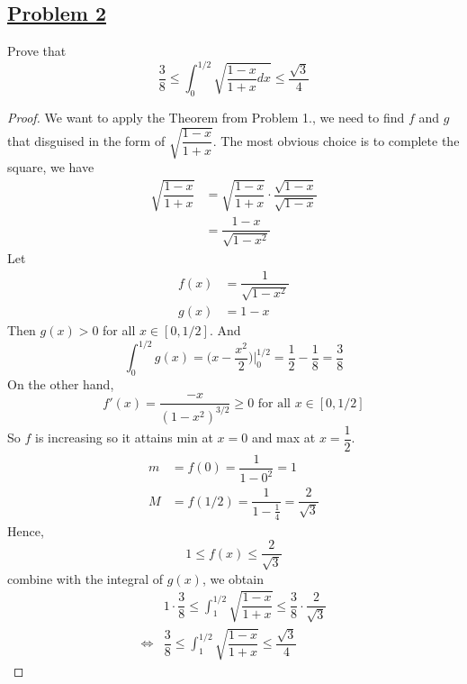 \documentclass[10pt,letterpaper]{article}
\begin{document}
	\subsection*{{\color{purple}\underline{Problem 2}}}
	Prove that 
	$$\dfrac{3}{8} \leq \displaystyle\int_0^{1/2} \sqrt{\dfrac{1-x}{1+x}dx} \leq \dfrac{\sqrt{3}}{4}$$
	\begin{proof}
	We want to apply the Theorem from Problem 1., we need to find $f$ and $g$ that disguised in the form
	of $\sqrt{\dfrac{1-x}{1+x}}$. The most obvious choice is to complete the square, we have
	\begin{align*}
	\sqrt{\dfrac{1-x}{1+x}} &= \sqrt{\dfrac{1-x}{1+x}} \cdot \dfrac{\sqrt{1-x}}{\sqrt{1-x}} \\
	&= \dfrac{1-x}{\sqrt{1 - x^2}} 
	\end{align*}
	Let
	\begin{align*}
	f(x) &= \dfrac{1}{\sqrt{1 - x^2}} \\
	g(x) &= 1 - x 
	\end{align*}	 
	Then $g(x) > 0$ for all $x \in [0, 1/2]$. And
	$$\displaystyle\int_{0}^{1/2} g(x) 
	= \bigg(x - \dfrac{x^2}{2}\bigg)\bigg|_0^{1/2} = \dfrac{1}{2} - \dfrac{1}{8} = \dfrac{3}{8}$$		
	On the other hand, 
	$$f'(x) = \dfrac{-x}{(1 - x^2)^{3/2}} \geq 0 \text{ for all } x \in [0, 1/2]$$
	So $f$ is increasing so it attains min at $x = 0$ and max at $x = \dfrac{1}{2}$.
	\begin{align*}
	m &= f(0) = \dfrac{1}{1 - 0^2} = 1 \\
	M &= f(1/2) = \dfrac{1}{1 - \frac{1}{4}} = \dfrac{2}{\sqrt{3}} 
	\end{align*}
	Hence,
	$$1 \leq f(x) \leq \dfrac{2}{\sqrt{3}}$$
	combine with the integral of $g(x)$, we obtain
	\begin{align*}
	& 1  \cdot \dfrac{3}{8} \leq \displaystyle\int_{1}^{1/2} 
	 \sqrt{\dfrac{1-x}{1+x}} \leq \dfrac{3}{8} \cdot \dfrac{2}{\sqrt{3}} \\
	\Leftrightarrow &
	 \dfrac{3}{8} \leq \displaystyle\int_{1}^{1/2} 
	 \sqrt{\dfrac{1-x}{1+x}} \leq \dfrac{\sqrt{3}}{4} 
	\end{align*}
	
	
	
	
	
	\end{proof}		

	
	
\end{document}
